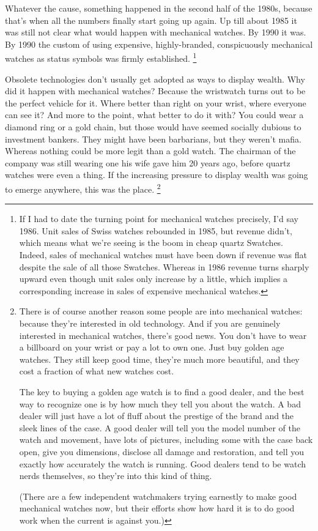 Whatever the cause, something happened in the second half of the 1980s,
because that's when all the numbers finally start going up again. Up
till about 1985 it was still not clear what would happen with mechanical
watches. By 1990 it was. By 1990 the custom of using expensive,
highly-branded, conspicuously mechanical watches as status symbols was
firmly established. \footnote{If I had to date the turning point for mechanical watches
precisely, I'd say 1986. Unit sales of Swiss watches rebounded in 1985,
but revenue didn't, which means what we're seeing is the boom in cheap
quartz Swatches. Indeed, sales of mechanical watches must have been down
if revenue was flat despite the sale of all those Swatches. Whereas in
1986 revenue turns sharply upward even though unit sales only increase
by a little, which implies a corresponding increase in sales of
expensive mechanical watches.}

Obsolete technologies don't usually get adopted as ways to display
wealth. Why did it happen with mechanical watches? Because the
wristwatch turns out to be the perfect vehicle for it. Where better than
right on your wrist, where everyone can see it? And more to the point,
what better to do it with? You could wear a diamond ring or a gold
chain, but those would have seemed socially dubious to investment
bankers. They might have been barbarians, but they weren't mafia.
Whereas nothing could be more legit than a gold watch. The chairman of
the company was still wearing one his wife gave him 20 years ago, before
quartz watches were even a thing. If the increasing pressure to display
wealth was going to emerge anywhere, this was the place.
\footnote{There is of course another reason some people are into
mechanical watches: because they're interested in old technology. And if
you are genuinely interested in mechanical watches, there's good news.
You don't have to wear a billboard on your wrist or pay a lot to own
one. Just buy golden age watches. They still keep good time, they're
much more beautiful, and they cost a fraction of what new watches cost.

The key to buying a golden age watch is to find a good dealer, and the
best way to recognize one is by how much they tell you about the watch.
A bad dealer will just have a lot of fluff about the prestige of the
brand and the sleek lines of the case. A good dealer will tell you the
model number of the watch and movement, have lots of pictures, including
some with the case back open, give you dimensions, disclose all damage
and restoration, and tell you exactly how accurately the watch is
running. Good dealers tend to be watch nerds themselves, so they're into
this kind of thing.

(There are a few independent watchmakers trying earnestly to make good
mechanical watches now, but their efforts show how hard it is to do good
work when the current is against you.)}

